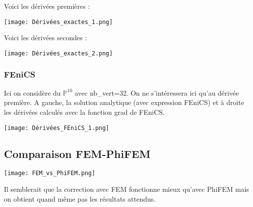 Voici les dérivées premières :

\begin{minipage}{\linewidth}
	\centering
	\texttt{[image: Dérivées\_exactes\_1.png]}
\end{minipage}

\newpage

Voici les dérivées secondes :

\begin{minipage}{\linewidth}
	\centering
	\texttt{[image: Dérivées\_exactes\_2.png]}
\end{minipage}

\subsubsection*{FEniCS}

Ici on considère du $\mathbb{P}^{10}$ avec nb\_vert=32. On ne s'intéressera ici qu'au dérivée première. A gauche, la solution analytique (avec expression FEniCS) et à droite les dérivées calculés avec la fonction grad de FEniCS.

\begin{minipage}{\linewidth}
	\centering
	\texttt{[image: Dérivées\_FEniCS\_1.png]}
\end{minipage}

\subsection{Comparaison FEM-PhiFEM}

\begin{minipage}{\linewidth}
	\centering
	\texttt{[image: FEM\_vs\_PhiFEM.png]}
\end{minipage}

Il semblerait que la correction avec FEM fonctionne mieux qu'avec PhiFEM mais on obtient quand même pas les résultats attendus.